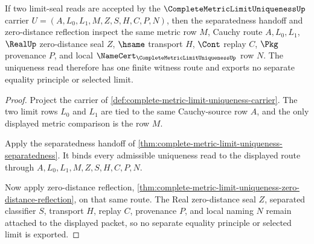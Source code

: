 \begin{theorem}
\label{thm:complete-metric-limit-uniqueness-common-window}
If two limit-seal reads are accepted by the $\CompleteMetricLimitUniquenessUp$ carrier $U=(A,L_{0},L_{1},M,Z,S,H,C,P,N)$, then the separatedness handoff and zero-distance reflection inspect the same metric row $M$, Cauchy route $A,L_{0},L_{1}$, $\RealUp$ zero-distance seal $Z$, $\hsame$ transport $H$, $\Cont$ replay $C$, $\Pkg$ provenance $P$, and local $\NameCert_{\CompleteMetricLimitUniquenessUp}$ row $N$. The uniqueness read therefore has one finite witness route and exports no separate equality principle or selected limit.
\end{theorem}
\begin{proof}
Project the carrier of \autoref{def:complete-metric-limit-uniqueness-carrier}. The two limit rows $L_{0}$ and $L_{1}$ are tied to the same Cauchy-source row $A$, and the only displayed metric comparison is the row $M$.

Apply the separatedness handoff of \autoref{thm:complete-metric-limit-uniqueness-separatedness}. It binds every admissible uniqueness read to the displayed route through $A,L_{0},L_{1},M,Z,S,H,C,P,N$.

Now apply zero-distance reflection, \autoref{thm:complete-metric-limit-uniqueness-zero-distance-reflection}, on that same route. The Real zero-distance seal $Z$, separated classifier $S$, transport $H$, replay $C$, provenance $P$, and local naming $N$ remain attached to the displayed packet, so no separate equality principle or selected limit is exported.
\end{proof}


